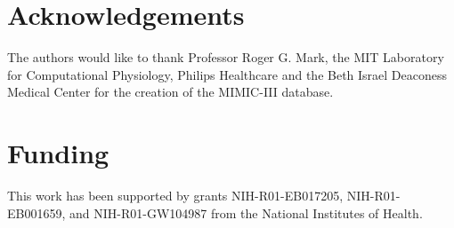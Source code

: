 \documentclass{bioinfo}
\begin{document}
\section*{Acknowledgements}

The authors would like to thank Professor Roger G. Mark, the MIT Laboratory for Computational Physiology, Philips Healthcare and the Beth Israel Deaconess Medical Center for the creation of the MIMIC-III database.%

\section*{Funding}

This work has been supported by grants NIH-R01-EB017205, NIH-R01-EB001659, and NIH-R01-GW104987 from the National Institutes of Health.%

%
%
%
%
%
%
%
%
%
\end{document}
